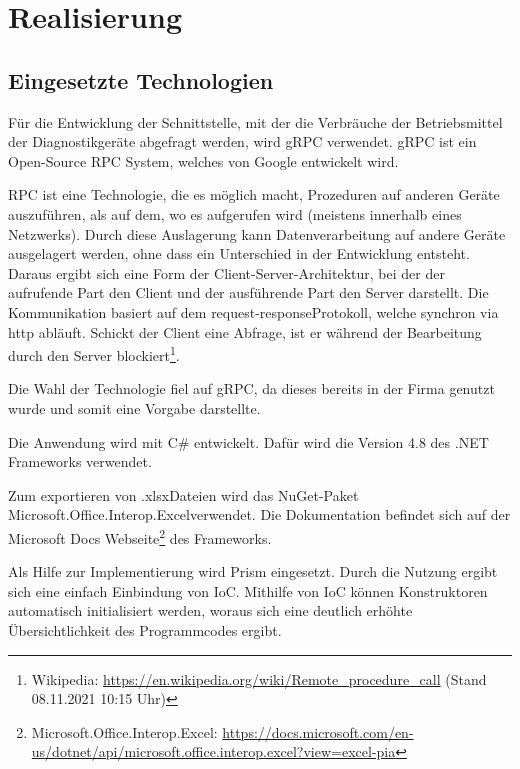 \section{Realisierung}
\label{sec:Realisierung}

\subsection{Eingesetzte Technologien}
\label{sec:EingesetzteTechnologien}
Für die Entwicklung der Schnittstelle, mit der die Verbräuche der Betriebsmittel der Diagnostikgeräte abgefragt werden, wird {\acs{gRPC}} verwendet. {\acs{gRPC}} ist ein Open-Source {\acs{RPC}} System, welches von Google entwickelt wird.

{\acs{RPC}} ist eine Technologie, die es möglich macht, Prozeduren auf anderen Geräte auszuführen, als auf dem, wo es aufgerufen wird (meistens innerhalb eines Netzwerks). Durch diese Auslagerung kann Datenverarbeitung auf andere Geräte ausgelagert werden, ohne dass ein Unterschied in der Entwicklung entsteht. Daraus ergibt sich eine Form der Client-Server-Architektur, bei der der aufrufende Part den Client und der ausführende Part den Server darstellt. Die Kommunikation basiert auf dem \glqq request-response\grqq \space Protokoll, welche synchron via http abläuft. Schickt der Client eine Abfrage, ist er während der Bearbeitung durch den Server blockiert\footnote{Wikipedia: \url{https://en.wikipedia.org/wiki/Remote_procedure_call} (Stand 08.11.2021 10:15 Uhr)}.

Die Wahl der Technologie fiel auf {\acs{gRPC}}, da dieses bereits in der Firma genutzt wurde und somit eine Vorgabe darstellte.

Die Anwendung wird mit C\# entwickelt. Dafür wird die Version 4.8 des .NET Frameworks verwendet.

Zum exportieren von \glqq .xlsx\grqq \space Dateien wird das {\acs{NuGet}}-Paket \glqq Microsoft.Office.Interop.Excel\grqq \space verwendet. Die Dokumentation befindet sich auf der Microsoft Docs Webseite\footnote{Microsoft.Office.Interop.Excel: \url{https://docs.microsoft.com/en-us/dotnet/api/microsoft.office.interop.excel?view=excel-pia}} des Frameworks.

Als Hilfe zur Implementierung wird {\acs{Prism}} eingesetzt. Durch die Nutzung ergibt sich eine einfach Einbindung von {\acs{IoC}}. Mithilfe von {\acs{IoC}} können Konstruktoren automatisch initialisiert werden, woraus sich eine deutlich erhöhte Übersichtlichkeit des Programmcodes ergibt.

